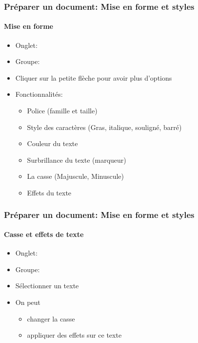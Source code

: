 \documentclass[xcolor=table]{beamer}
\begin{document}
\begin{frame}
\frametitle{Préparer un document: Mise en forme et styles}
\framesubtitle{Mise en forme}

\begin{minipage}{0.48\textwidth}
\begin{itemize}
	\item Onglet: 
	\item Groupe: 
	\item Cliquer sur la petite flèche pour avoir plus d'options
	\item Fonctionnalités:
	\begin{itemize}
		\item Police (famille et taille) 
		\item Style des caractères (Gras, italique, souligné, barré) 
		\item Couleur du texte
		\item Surbrillance du texte (marqueur)
		\item La casse (Majuscule, Minuscule)
		\item Effets du texte
	\end{itemize}
\end{itemize}
\end{minipage}
\begin{minipage}{0.50\textwidth}
	
\end{minipage}

\end{frame}

\begin{frame}
\frametitle{Préparer un document: Mise en forme et styles}
\framesubtitle{Casse et effets de texte}

\begin{minipage}{0.58\textwidth}
\begin{itemize}
	\item Onglet: 
	\item Groupe: 
	\item Sélectionner un texte
	\item On peut
	\begin{itemize}
		\item changer la casse 
		\item appliquer des effets sur ce texte
	\end{itemize}
\end{itemize}
\end{minipage}
\begin{minipage}{0.4\textwidth}
	
\end{minipage}

\end{frame}
\end{document}

